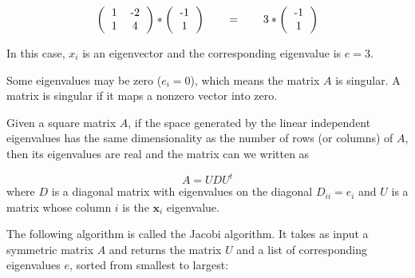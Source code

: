 \documentclass[justified, sixbynine]{tufte-book}
\theoremstyle{plain}%
\newtheorem * {corollary}{Corollary}
\theoremstyle{definition}
\theoremstyle{remark}
\newtheorem * {remark}{Remark}
\newtheorem * {note}{Note}
\begin{document}
\begin{fullwidth}
\begin{equation}
\left(\begin{tabular}{ccc}
1 & -2  \\
1 & 4  \\
\end{tabular}\right) * 
\left(\begin{tabular}{c}
-1 \\
1 \\
\end{tabular}\right) \qquad =  \qquad
3 * \left(\begin{tabular}{c}
-1 \\
1 \\
\end{tabular}\right)
\end{equation}

In this case, $x_i$ is an eigenvector and the corresponding eigenvalue is $e=3$.

Some eigenvalues may be zero ($e_i=0$), which means the matrix $A$ is singular. A matrix is singular if it maps a nonzero vector into zero.

Given a square matrix $A$, if the space generated by the linear independent eigenvalues has the same dimensionality as the number of rows (or columns) of $A$, then its eigenvalues are real and the matrix can we written as

\begin{equation}
A = U D U^t
\end{equation}
where
$D$ is a diagonal matrix with eigenvalues on the diagonal $D_{ii} = e_i$ and
$U$ is a matrix whose column $i$ is the $\mathbf{x}_i$ eigenvalue.

The following algorithm is called the Jacobi algorithm. It takes as input a symmetric matrix $A$ and returns the matrix $U$ and a list of corresponding eigenvalues $e$, sorted from smallest to largest:



\end{fullwidth}
\end{document}

